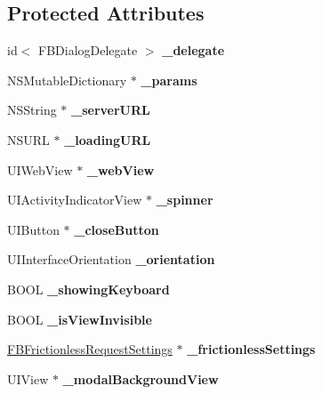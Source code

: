 \subsection*{Protected Attributes}
\begin{DoxyCompactItemize}
\item 
\mbox{\label{interfaceFBDialog_a7946e817cb1cb8450dd91821be9ee66a}} 
id$<$ F\+B\+Dialog\+Delegate $>$ {\bfseries \+\_\+delegate}
\item 
\mbox{\label{interfaceFBDialog_a696eceb0e70b6c5c89f8de8f32485d18}} 
N\+S\+Mutable\+Dictionary $\ast$ {\bfseries \+\_\+params}
\item 
\mbox{\label{interfaceFBDialog_ad278ce3892c3c3c8cd9229f842679606}} 
N\+S\+String $\ast$ {\bfseries \+\_\+server\+U\+RL}
\item 
\mbox{\label{interfaceFBDialog_a6120401d7fd8979665d1a447af164d9f}} 
N\+S\+U\+RL $\ast$ {\bfseries \+\_\+loading\+U\+RL}
\item 
\mbox{\label{interfaceFBDialog_a33f638655e1fbd1843cfe3fc378cc169}} 
U\+I\+Web\+View $\ast$ {\bfseries \+\_\+web\+View}
\item 
\mbox{\label{interfaceFBDialog_a4bd0adcc912b0574b6ca1e294566fa05}} 
U\+I\+Activity\+Indicator\+View $\ast$ {\bfseries \+\_\+spinner}
\item 
\mbox{\label{interfaceFBDialog_a4a38348c4231506f5689ce8f26d96f37}} 
U\+I\+Button $\ast$ {\bfseries \+\_\+close\+Button}
\item 
\mbox{\label{interfaceFBDialog_a56ba5022fc5ce43cd0e8166efee1df98}} 
U\+I\+Interface\+Orientation {\bfseries \+\_\+orientation}
\item 
\mbox{\label{interfaceFBDialog_a77c9eddfdf58634226bb0946b5eea792}} 
B\+O\+OL {\bfseries \+\_\+showing\+Keyboard}
\item 
\mbox{\label{interfaceFBDialog_a8c248d9829fe5b85c174a17db2e4ae4d}} 
B\+O\+OL {\bfseries \+\_\+is\+View\+Invisible}
\item 
\mbox{\label{interfaceFBDialog_ace5a21fe022334e642d9c65c5bbd6598}} 
\hyperlink{interfaceFBFrictionlessRequestSettings}{F\+B\+Frictionless\+Request\+Settings} $\ast$ {\bfseries \+\_\+frictionless\+Settings}
\item 
\mbox{\label{interfaceFBDialog_aea094676a42ceb2c96c30211634c9a66}} 
U\+I\+View $\ast$ {\bfseries \+\_\+modal\+Background\+View}
\end{DoxyCompactItemize}
